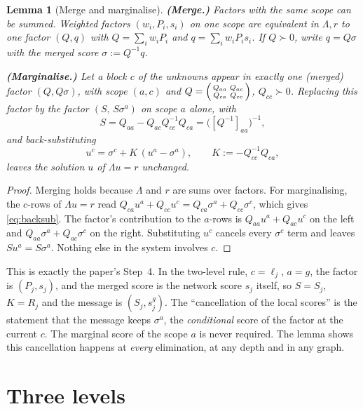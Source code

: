 \documentclass[11pt]{article}
\newtheorem{lemma}[theorem]{Lemma}
\theoremstyle{definition}
\theoremstyle{remark}
\begin{document}
\begin{lemma}[Merge and marginalise]\label{lem:marginalise}
\textbf{(Merge.)} Factors with the same scope can be summed. Weighted factors
$(w_i,P_i,s_i)$ on one scope are equivalent in $\Lambda,r$ to one factor
$(Q,q)$ with $Q=\sum_iw_iP_i$ and $q=\sum_iw_iP_is_i$. If $Q\succ0$, write
$q=Q\sigma$ with the \emph{merged score} $\sigma:=Q^{-1}q$.

\textbf{(Marginalise.)} Let a block $c$ of the unknowns appear in exactly one
(merged) factor $(Q,Q\sigma)$, with scope $(a,c)$ and
$Q=\begin{psmallmatrix}Q_{aa}&Q_{ac}\\Q_{ca}&Q_{cc}\end{psmallmatrix}$,
$Q_{cc}\succ0$. Replacing this factor by the factor $(S,\,S\sigma^a)$ on scope
$a$ alone, with
\begin{equation}\label{eq:schur}
S=Q_{aa}-Q_{ac}Q_{cc}^{-1}Q_{ca}=\big([Q^{-1}]_{aa}\big)^{-1},
\end{equation}
and back-substituting
\begin{equation}\label{eq:backsub}
u^c=\sigma^c+K\,(u^a-\sigma^a),\qquad K:=-Q_{cc}^{-1}Q_{ca},
\end{equation}
leaves the solution $u$ of $\Lambda u=r$ unchanged.
\end{lemma}
\begin{proof}
Merging holds because $\Lambda$ and $r$ are sums over factors. For
marginalising, the $c$-rows of $\Lambda u=r$ read
$Q_{ca}u^a+Q_{cc}u^c=Q_{ca}\sigma^a+Q_{cc}\sigma^c$, which gives
\eqref{eq:backsub}. The factor's contribution to the $a$-rows is
$Q_{aa}u^a+Q_{ac}u^c$ on the left and $Q_{aa}\sigma^a+Q_{ac}\sigma^c$ on the
right. Substituting $u^c$ cancels every $\sigma^c$ term and leaves
$Su^a=S\sigma^a$. Nothing else in the system involves $c$.
\end{proof}

This is exactly the paper's Step~4. In the two-level rule, $c=\ell_j$,
$a=g$, the factor is $(P_j,s_j)$, and the merged score is the network score
$s_j$ itself, so $S=S_j$, $K=R_j$ and the message is $(S_j,s_j^g)$. The
``cancellation of the local scores'' is the statement that the message keeps
$\sigma^a$, the \emph{conditional} score of the factor at the current $c$. The
marginal score of the scope $a$ is never required. The lemma shows this
cancellation happens at \emph{every} elimination, at any depth and in any
graph.

\section{Three levels}\label{sec:three}
\end{document}
